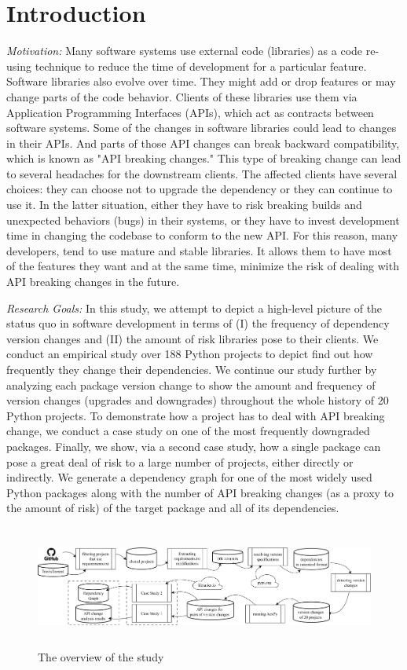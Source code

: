 \documentclass[conference]{IEEEtran}
\begin{document}
\section{Introduction}
\textit{Motivation: }Many software systems use external code (libraries) as a code re-using technique to reduce the time of development for a particular feature. Software libraries also evolve over time. They might add or drop features or may change parts of the code behavior. Clients of these libraries use them via Application Programming Interfaces (APIs), which act as contracts between software systems. Some of the changes in software libraries could lead to changes in their APIs. And parts of those API changes can break backward compatibility, which is known as "API breaking changes." This type of breaking change can lead to several headaches for the downstream clients. The affected clients have several choices: they can choose not to upgrade the dependency or they can continue to use it. In the latter situation, either they have to risk breaking builds and unexpected behaviors (bugs) in their systems, or they have to invest development time in changing the codebase to conform to the new API. For this reason, many developers, tend to use mature and stable libraries. It allows them to have most of the features they want and at the same time, minimize the risk of dealing with API breaking changes in the future.

\textit{Research Goals: }In this study, we attempt to depict a high-level picture of the status quo in software development in terms of (I) the frequency of dependency version changes and (II) the amount of risk libraries pose to their clients. We conduct an empirical study over 188 Python projects to depict find out how frequently they change their dependencies. We continue our study further by analyzing each package version change to show the amount and frequency of version changes (upgrades and downgrades) throughout the whole history of 20 Python projects. To demonstrate how a project has to deal with API breaking change, we conduct a case study on one of the most frequently downgraded packages. Finally, we show, via a second case study, how a single package can pose a great deal of risk to a large number of projects, either directly or indirectly. We generate a dependency graph for one of the most widely used Python packages along with the number of API breaking changes (as a proxy to the amount of risk) of the target package and all of its dependencies.

\begin{figure}[t!]
  \includegraphics[width=18cm,height=4cm]{figs/Untitled Diagram-Page-2.drawio.png}
  \caption{The overview of the study}
\end{figure}
\end{document}
